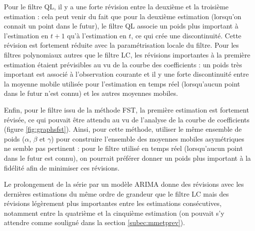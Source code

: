 \documentclass[
  12pt,
  a4paper,french]{article}
\newcommand\1{\mathds{1}}
\begin{document}
Pour le filtre QL, il y a une forte révision entre la deuxième et la troisième estimation : cela peut venir du fait que pour la deuxième estimation (lorsqu'on connait un point dans le futur), le filtre QL associe un poids plus important à l'estimation en \(t+1\) qu'à l'estimation en \(t\), ce qui crée une discontinuité.
Cette révision est fortement réduite avec la paramétrisation locale du filtre.
Pour les filtres polynomiaux autres que le filtre LC, les révisions importantes à la première estimation étaient prévisibles au vu de la courbe des coefficients : un poids très important est associé à l'observation courante et il y une forte discontinuité entre la moyenne mobile utilisée pour l'estimation en temps réel (lorsqu'aucun point dans le futur n'est connu) et les autres moyennes mobiles.

Enfin, pour le filtre issu de la méthode FST, la première estimation est fortement révisée, ce qui pouvait être attendu au vu de l'analyse de la courbe de coefficients (figure \ref{fig:graphsfst}).
Ainsi, pour cette méthode, utiliser le même ensemble de poids (\(\alpha\), \(\beta\) et \(\gamma\)) pour construire l'ensemble des moyennes mobiles asymétriques ne semble pas pertinent : pour le filtre utilisé en temps réel (lorsqu'aucun point dans le futur est connu), on pourrait préférer donner un poids plus important à la fidélité afin de minimiser ces révisions.

Le prolongement de la série par un modèle ARIMA donne des révisions avec les dernières estimations du même ordre de grandeur que le filtre LC mais des révisions légèrement plus importantes entre les estimations consécutives, notamment entre la quatrième et la cinquième estimation (on pouvait s'y attendre comme souligné dans la section \ref{subec:mmetprev}).
\end{document}
